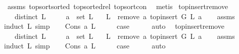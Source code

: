 \begin{isabellebody}
\ assms\ top{\isacharunderscore}{\kern0pt}sort{\isacharunderscore}{\kern0pt}sorted\ top{\isacharunderscore}{\kern0pt}sorted{\isacharunderscore}{\kern0pt}rel{}\ top{\isacharunderscore}{\kern0pt}sort{\isacharunderscore}{\kern0pt}con\ \isamarkupfalse%
\ metis%
\endisatagproof
{\isafoldproof}%
%
\isadelimproof
\isanewline
%
\endisadelimproof
\isanewline
{}\isamarkupfalse%
\ top{\isacharunderscore}{\kern0pt}insert{\isacharunderscore}{\kern0pt}remove{\isacharcolon}{\kern0pt}\isanewline
\ \ \ {\isachardoublequoteopen}distinct\ L{\isachardoublequoteclose}\isanewline
\ \ \ \ \ {\isachardoublequoteopen}a\ {\isasymnotin}\ set\ L{\isachardoublequoteclose}\isanewline
\ \ \ {\isachardoublequoteopen}L\ {\isacharequal}{\kern0pt}\ remove{}\ a\ {\isacharparenleft}{\kern0pt}top{\isacharunderscore}{\kern0pt}insert\ G\ L\ a{\isacharparenright}{\kern0pt}{\isachardoublequoteclose}\isanewline
%
\isadelimproof
\ \ %
\endisadelimproof
%
\isatagproof
{}\isamarkupfalse%
\ assms\ \isanewline
{}\isamarkupfalse%
{\isacharparenleft}{\kern0pt}induct\ L{\isacharcomma}{\kern0pt}\ simp{\isacharparenright}{\kern0pt}\isanewline
\ \ \isamarkupfalse%
\ {\isacharparenleft}{\kern0pt}Cons\ a\ L{\isacharparenright}{\kern0pt}\isanewline
\ \ \isamarkupfalse%
\ \isamarkupfalse%
\ {\isacharquery}{\kern0pt}case\isanewline
\ \ \ \ \isamarkupfalse%
\ auto\ \isanewline
{}\isamarkupfalse%
%
\endisatagproof
{\isafoldproof}%
%
\isadelimproof
\isanewline
%
\endisadelimproof
\isanewline
\isanewline
{}\isamarkupfalse%
\ top{\isacharunderscore}{\kern0pt}insert{\isacharunderscore}{\kern0pt}remove{}{\isacharcolon}{\kern0pt}\isanewline
\ \ \ {\isachardoublequoteopen}distinct\ L{\isachardoublequoteclose}\isanewline
\ \ \ \ \ {\isachardoublequoteopen}a\ {\isasymnotin}\ set\ L{\isachardoublequoteclose}\isanewline
\ \ \ {\isachardoublequoteopen}L\ {\isacharequal}{\kern0pt}\ remove{}\ a\ {\isacharparenleft}{\kern0pt}top{\isacharunderscore}{\kern0pt}insert\ G\ L\ a{\isacharparenright}{\kern0pt}{\isachardoublequoteclose}\isanewline
%
\isadelimproof
\ \ %
\endisadelimproof
%
\isatagproof
{}\isamarkupfalse%
\ assms\ \isanewline
{}\isamarkupfalse%
{\isacharparenleft}{\kern0pt}induct\ L{\isacharcomma}{\kern0pt}\ simp{\isacharparenright}{\kern0pt}\isanewline
\ \ \isamarkupfalse%
\ {\isacharparenleft}{\kern0pt}Cons\ a\ L{\isacharparenright}{\kern0pt}\isanewline
\ \ \isamarkupfalse%
\ \isamarkupfalse%
\ {\isacharquery}{\kern0pt}case\isanewline
\ \ \ \ \isamarkupfalse%
\ auto\ \isanewline
{}\isamarkupfalse%
%
\endisatagproof
{\isafoldproof}%
%
\isadelimproof
\isanewline
%
\endisadelimproof
\ \ \isanewline
%
\isadelimtheory
%
\endisadelimtheory
%
\isatagtheory
{}\isamarkupfalse%
%
\endisatagtheory
{\isafoldtheory}%
%
\isadelimtheory
%
\endisadelimtheory
%
\end{isabellebody}%
